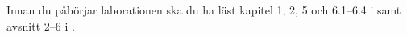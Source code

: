 Innan du påbörjar laborationen ska du ha läst kapitel 1, 2, 5 och 6.1--6.4 
i \cite{Brookshear2012csa} samt avsnitt 2--6 i  
\cite{pythonkramaren1}.
